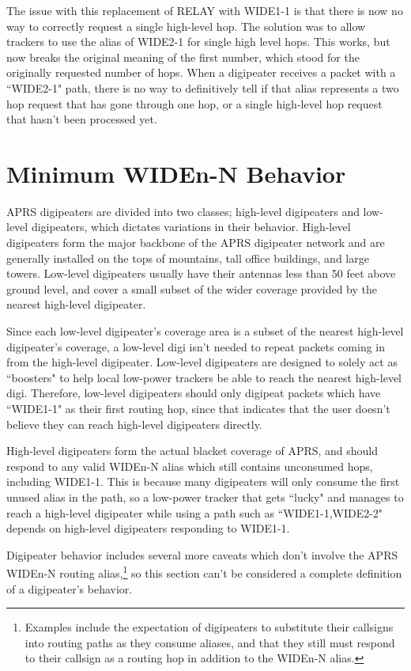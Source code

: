 The issue with this replacement of RELAY with WIDE1-1 is that there is now
no way to correctly request a single high-level hop.
The solution was to allow trackers to use the alias of WIDE2-1 for single
high level hops.
This works, but now breaks the original meaning of the first number,
which stood for the originally requested number of hops.
When a digipeater receives a packet with a ``WIDE2-1" path, 
there is no way to definitively
tell if that alias represents a two hop request that has gone through one hop,
or a single high-level hop request that hasn't been processed yet.

\section{Minimum WIDEn-N Behavior}

APRS digipeaters are divided into two classes; high-level digipeaters and
low-level digipeaters, which dictates variations in their behavior.
High-level digipeaters form the major backbone of the APRS digipeater network
and are generally installed on the tops of mountains,
tall office buildings, and large towers.
Low-level digipeaters usually have their antennas less than 50 feet above ground
level, and cover a small subset of the wider coverage provided by the
nearest high-level digipeater.

Since each low-level digipeater's coverage area is a subset of the
nearest high-level digipeater's coverage, a low-level digi isn't needed
to repeat packets coming in from the high-level digipeater.
Low-level digipeaters are designed to solely act as ``boosters" to
help local low-power trackers be able to reach the nearest high-level digi.
Therefore, low-level digipeaters should only digipeat packets which
have ``WIDE1-1" as their first routing hop, since that indicates that
the user doesn't believe they can reach high-level digipeaters directly.

High-level digipeaters form the actual blacket coverage of APRS, and
should respond to any valid WIDEn-N alias which still contains unconsumed hops,
including WIDE1-1. This is because many digipeaters will only consume the first
unused alias in the path, so a low-power tracker that gets ``lucky" and manages to
reach a high-level digipeater while using a path such as ``WIDE1-1,WIDE2-2"
depends on high-level digipeaters responding to WIDE1-1.

Digipeater behavior includes several more caveats which don't involve the APRS
WIDEn-N routing alias,\footnote{Examples include the expectation of digipeaters
	to substitute their callsigns into routing paths as they consume aliases,
	and that they still must respond to their callsign as a routing hop in 
addition to the WIDEn-N alias.} 
so this section can't be considered a complete definition of a digipeater's behavior.

